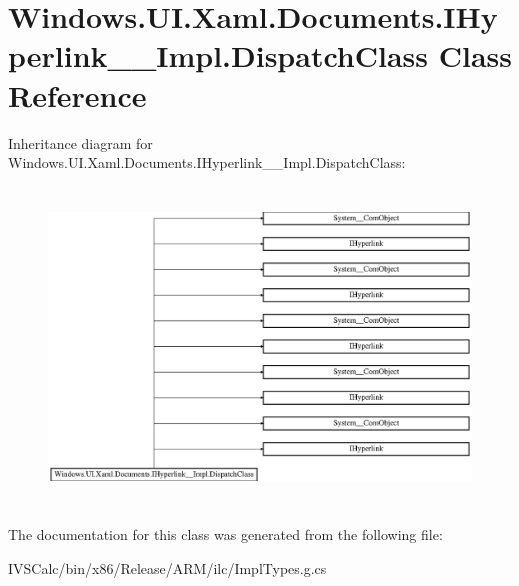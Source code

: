 \hypertarget{class_windows_1_1_u_i_1_1_xaml_1_1_documents_1_1_i_hyperlink_____impl_1_1_dispatch_class}{}\section{Windows.\+U\+I.\+Xaml.\+Documents.\+I\+Hyperlink\+\_\+\+\_\+\+Impl.\+Dispatch\+Class Class Reference}
\label{class_windows_1_1_u_i_1_1_xaml_1_1_documents_1_1_i_hyperlink_____impl_1_1_dispatch_class}
Inheritance diagram for Windows.\+U\+I.\+Xaml.\+Documents.\+I\+Hyperlink\+\_\+\+\_\+\+Impl.\+Dispatch\+Class\+:\begin{figure}[H]
\begin{center}
\leavevmode
\includegraphics[height=8.461538cm]{class_windows_1_1_u_i_1_1_xaml_1_1_documents_1_1_i_hyperlink_____impl_1_1_dispatch_class}
\end{center}
\end{figure}


The documentation for this class was generated from the following file\+:\begin{DoxyCompactItemize}
\item 
I\+V\+S\+Calc/bin/x86/\+Release/\+A\+R\+M/ilc/Impl\+Types.\+g.\+cs\end{DoxyCompactItemize}
